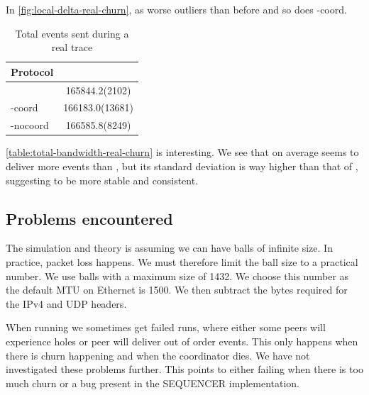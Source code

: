 In \autoref{fig:local-delta-real-churn}, \epto as worse outliers than before and so does \jgroups-coord.
\begin{table}[hpt]
	\centering
	\caption{Total events sent during a real trace}
\begin{tabular}{lS}
	\toprule
	Protocol &\\
	\midrule
	\epto & 165844.2(2102)\\
	\jgroups-coord & 166183.0(13681)\\
	\jgroups-nocoord & 166585.8(8249)\\
	\bottomrule
\end{tabular}
    \label{table:total-sent-real-churn}
\end{table}
\autoref{table:total-bandwidth-real-churn} is interesting. We see that on average \jgroups seems to deliver more events than \epto, but its standard deviation is way higher than that of \epto, suggesting \epto to be more stable and consistent.
\subsection{Problems encountered}
The \epto simulation and theory is assuming we can have balls of infinite size. In practice, packet loss happens. We must therefore limit the ball size to a practical number. We use balls with a maximum size of \SI{1432}{\byte}. We choose this number as the default MTU on Ethernet is \SI{1500}{\byte}. We then subtract the bytes required for the IPv4 and UDP headers.
\par
When running \jgroups we sometimes get failed runs, where either some peers will experience holes or peer will deliver out of order events. This only happens when there is churn happening and when the coordinator dies. We have not investigated these problems further. This points to either \jgroups failing when there is too much churn or a bug present in the SEQUENCER implementation.
